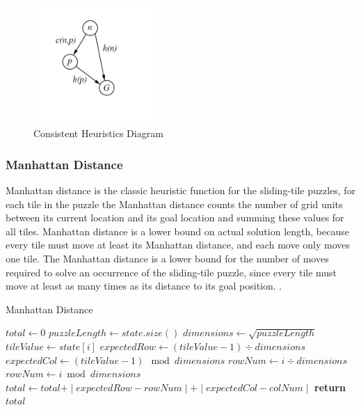 \documentclass[final]{cmpreport}
\begin{document}
\begin{figure}[ht]
	\centering
	\includegraphics[width=0.4\textwidth]{consistent}
	\captionsetup{justification=centering}
	\caption{Consistent Heuristics Diagram}
\end{figure}



\subsubsection{Manhattan Distance}
Manhattan distance is the classic heuristic function for the sliding-tile puzzles, for each tile in the puzzle the Manhattan distance counts the number of grid units between its current location
and its goal location and summing these values for all tiles. Manhattan distance is a lower bound on actual solution length, because every tile must move at least its Manhattan distance, and each move only moves one tile. The Manhattan distance is a lower bound for the number of moves required to solve an occurrence of the sliding-tile puzzle, since every tile must move at least as many times as its distance to its goal position. \citep{DBLP:conf/ccgrid/LinnertSB14}.



	
\begin{algorithm}
	\caption{Manhattan Distance}\label{Manhattan Distance}
	\begin{algorithmic}[1]
			
		\State$total\gets 0$
		\State$puzzleLength\gets state.size()$
		\State$dimensions\gets \sqrt{puzzleLength}$
			
		\State $tileValue\gets state[i]$
		\State $expectedRow\gets (tileValue -1)\div dimensions$
		\State $expectedCol\gets (tileValue -1)\mod dimensions$
		\State $rowNum \gets i\div dimensions$
		\State $rowNum\gets i \bmod dimensions$
		\State $total\gets total \texttt{+} \mid{expectedRow-rowNum}\mid\texttt{+}\mid{expectedCol-colNum}\mid$
		\EndFor
		\State \textbf{return} $total$
		\EndProcedure
	\end{algorithmic}
\end{algorithm}
\end{document}
